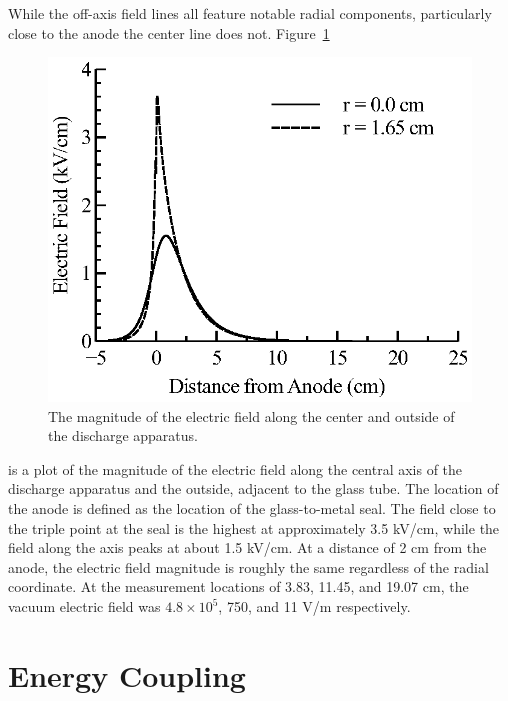 While the off-axis field lines all feature notable radial components,
particularly close to the anode the center line does not.
Figure~\ref{fig:centere}
\begin{figure}
  \centering
  \includegraphics{./chapters/experiment/figures/centere.eps}
  \caption{The magnitude of the electric field along the center and outside of
  the discharge apparatus.}
  \label{fig:centere}
\end{figure}
is a plot of the magnitude of the electric field along the central axis of the
discharge apparatus and the outside, adjacent to the glass tube. The location of
the anode is defined as the location of the glass-to-metal seal. The field close
to the triple point at the seal is the highest at approximately 3.5 kV/cm, while
the field along the axis peaks at about 1.5 kV/cm. At a distance of 2 cm from
the anode, the electric field magnitude is roughly the same regardless of the
radial coordinate. At the measurement locations of 3.83, 11.45, and 19.07 cm,
the vacuum electric field was $4.8 \times 10^5$, 750, and 11 V/m respectively. 

\section{Energy Coupling}

